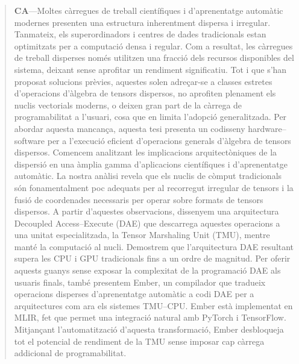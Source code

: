 \begin{abstract}
\textbf{CA}---Moltes càrregues de treball científiques i d’aprenentatge automàtic modernes presenten una estructura inherentment dispersa i irregular. Tanmateix, els superordinadors i centres de dades tradicionals estan optimitzats per a computació densa i regular. Com a resultat, les càrregues de treball disperses només utilitzen una fracció dels recursos disponibles del sistema, deixant sense aprofitar un rendiment significatiu. Tot i que s’han proposat solucions prèvies, aquestes solen adreçar-se a classes estretes d’operacions d’àlgebra de tensors dispersos, no aprofiten plenament els nuclis vectorials moderns, o deixen gran part de la càrrega de programabilitat a l’usuari, cosa que en limita l’adopció generalitzada. Per abordar aquesta mancança, aquesta tesi presenta un codisseny hardware--software per a l’execució eficient d’operacions generals d’àlgebra de tensors dispersos. Comencem analitzant les implicacions arquitectòniques de la dispersió en una àmplia gamma d’aplicacions científiques i d’aprenentatge automàtic. La nostra anàlisi revela que els nuclis de còmput tradicionals són fonamentalment poc adequats per al recorregut irregular de tensors i la fusió de coordenades necessaris per operar sobre formats de tensors dispersos. A partir d’aquestes observacions, dissenyem una arquitectura Decoupled Access--Execute (DAE) que descarrega aquestes operacions a una unitat especialitzada, la Tensor Marshaling Unit (TMU), mentre manté la computació al nucli. Demostrem que l’arquitectura DAE resultant supera les CPU i GPU tradicionals fins a un ordre de magnitud. Per oferir aquests guanys sense exposar la complexitat de la programació DAE als usuaris finals, també presentem Ember, un compilador que tradueix operacions disperses d’aprenentatge automàtic a codi DAE per a arquitectures com ara els sistemes TMU--CPU. Ember està implementat en MLIR, fet que permet una integració natural amb PyTorch i TensorFlow. Mitjançant l’automatització d’aquesta transformació, Ember desbloqueja tot el potencial de rendiment de la TMU sense imposar cap càrrega addicional de programabilitat.
\end{abstract}

